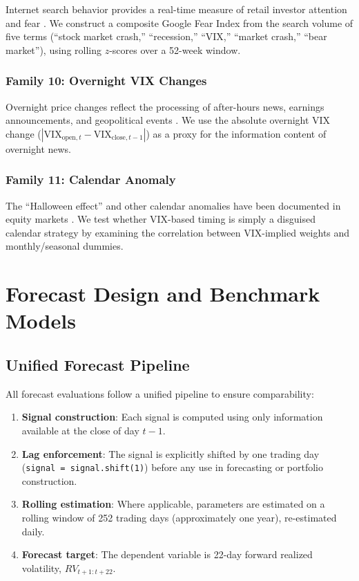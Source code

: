 \documentclass[12pt,a4paper]{article}
\begin{document}
Internet search behavior provides a real-time measure of retail investor attention and fear \citep{da2011, preis2013}. We construct a composite Google Fear Index from the search volume of five terms (``stock market crash,'' ``recession,'' ``VIX,'' ``market crash,'' ``bear market''), using rolling $z$-scores over a 52-week window.

\subsubsection{Family 10: Overnight VIX Changes}

Overnight price changes reflect the processing of after-hours news, earnings announcements, and geopolitical events \citep{bollerslev2020}. We use the absolute overnight VIX change ($|\text{VIX}_{\text{open},t} - \text{VIX}_{\text{close},t-1}|$) as a proxy for the information content of overnight news.

\subsubsection{Family 11: Calendar Anomaly}

The ``Halloween effect'' and other calendar anomalies have been documented in equity markets \citep{bouman2002}. We test whether VIX-based timing is simply a disguised calendar strategy by examining the correlation between VIX-implied weights and monthly/seasonal dummies.


\section{Forecast Design and Benchmark Models}
\label{sec:methodology}

\subsection{Unified Forecast Pipeline}

All forecast evaluations follow a unified pipeline to ensure comparability:

\begin{enumerate}
    \item \textbf{Signal construction}: Each signal is computed using only information available at the close of day $t-1$.
    \item \textbf{Lag enforcement}: The signal is explicitly shifted by one trading day (\texttt{signal = signal.shift(1)}) before any use in forecasting or portfolio construction.
    \item \textbf{Rolling estimation}: Where applicable, parameters are estimated on a rolling window of 252 trading days (approximately one year), re-estimated daily.
    \item \textbf{Forecast target}: The dependent variable is 22-day forward realized volatility, $RV_{t+1:t+22}$.
\end{enumerate}
\end{document}
